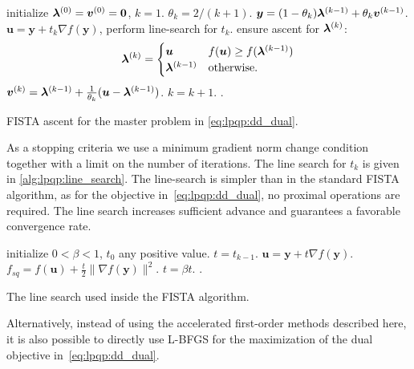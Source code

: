 \begin{algorithm}[htb]
\begin{algorithmic}[1]
    \STATE initialize $\bm{\lambda}^{(0)} = \bm{v}^{(0)} = \bm{0}$, $k=1$.
    \REPEAT
        \STATE $\theta_k = 2/(k+1)$.
        \STATE $\bm{y} = (1-\theta_k)\bm{\lambda}^{(k-1)}+\theta_k \bm{v}^{(k-1)}$.
        \STATE $\bm{u} = \bm{y} + t_k \nabla f(\bm{y})$, perform line-search
        for $t_k$.
        \STATE ensure ascent for $\bm{\lambda}^{(k)}$:
        \[
            \bm{\lambda}^{(k)} = \begin{cases}
                \bm{u} &    f(\bm{u})\geq f(\bm{\lambda}^{(k-1)})\\
                \bm{\lambda}^{(k-1)} &    \text{otherwise.}
            \end{cases}
        \]
        \STATE $\bm{v}^{(k)} = \bm{\lambda}^{(k-1)}+\frac{1}{\theta_k}(\bm{u}
        - \bm{\lambda}^{(k-1)})$.
        \STATE $k=k+1$.
    .
\end{algorithmic}
\caption{\ac{FISTA} ascent for the master problem in \eqref{eq:lpqp:dd_dual}.}
\label{alg:lpqp:dual_decomposition_fista}
\end{algorithm}
As a stopping criteria we use a minimum gradient norm change condition
together with a limit on the number of iterations.
The line search for $t_k$ is given in \autoref{alg:lpqp:line_search}. The
line-search is simpler than in the standard \ac{FISTA} algorithm, as for the objective
in~\eqref{eq:lpqp:dd_dual}, no proximal operations are required. The line
search increases sufficient advance and guarantees a favorable convergence
rate.
\begin{algorithm}[htb]
\begin{algorithmic}[1]
    \STATE initialize $0<\beta<1$, $t_0$ any positive value.
    \STATE $t = t_{k-1}$.
    \REPEAT
        \STATE $\bm{u} = \bm{y} + t\nabla f(\bm{y})$.
        \STATE $f_{sq} = f(\bm{u}) + \frac{t}{2}\|\nabla f(\bm{y})\|^2$.
            \STATE $t = \beta t$.
        \ENDIF
    .
\end{algorithmic}
\caption{The line search used inside the \ac{FISTA} algorithm.}
\label{alg:lpqp:line_search}
\end{algorithm}
Alternatively, instead of using the accelerated first-order methods described here, it is
also possible to directly use \ac{L-BFGS} for the maximization of the dual objective
in~\eqref{eq:lpqp:dd_dual}.


